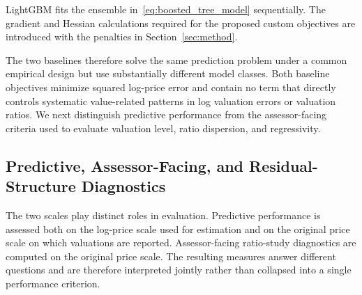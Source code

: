\documentclass[10pt]{article}
\theoremstyle{definition}
\newcommand{\1}{\mathbf{1}}
\newcommand{\oldtext}[1]{\textcolor{blue}{\sout{#1}}}
\newcommand{\newtext}[1]{\textcolor{impGreen}{#1}}
\begin{document}
LightGBM fits the ensemble in~\eqref{eq:boosted_tree_model} sequentially. The gradient and Hessian calculations required for the proposed custom objectives are introduced with the penalties in Section~\ref{sec:method}.

The two baselines therefore solve the same prediction problem under a common empirical design but use substantially different model classes.
{Both baseline objectives minimize squared log-price error and contain no term that directly controls systematic value-related patterns in log valuation errors or valuation ratios. We next distinguish predictive performance from the assessor-facing criteria used to evaluate valuation level, ratio dispersion, and regressivity.}


\subsection{
\texorpdfstring{
\newtext{Predictive, Assessor-Facing, and Residual-Structure Diagnostics}}{Predictive, Assessor-Facing, and Residual-Structure Diagnostics}}
\label{subsec:metrics}


{The two scales play distinct roles in evaluation. Predictive performance is assessed both on the log-price scale used for estimation and on the original price scale on which valuations are reported. Assessor-facing ratio-study diagnostics are computed on the original price scale. The resulting measures answer different questions and are therefore interpreted jointly rather than collapsed into a single performance criterion.}
\end{document}
